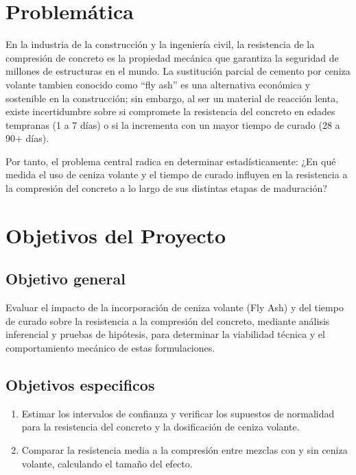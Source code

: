 \documentclass[
]{book}
\begin{document}
\section{Problemática}\label{problemuxe1tica}

En la industria de la construcción y la ingeniería civil, la resistencia de la compresión de concreto es la propiedad mecánica que garantiza la seguridad de millones de estructuras en el mundo. La sustitución parcial de cemento por ceniza volante tambien conocido como ``fly ash'' es una alternativa económica y sostenible en la construcción; sin embargo, al ser un material de reacción lenta, existe incertidumbre sobre si compromete la resistencia del concreto en edades tempranas (1 a 7 días) o si la incrementa con un mayor tiempo de curado (28 a 90+ días).

Por tanto, el problema central radica en determinar estadísticamente: ¿En qué medida el uso de ceniza volante y el tiempo de curado influyen en la resistencia a la compresión del concreto a lo largo de sus distintas etapas de maduración?

\section{Objetivos del Proyecto}\label{objetivos-del-proyecto}

\subsection{Objetivo general}\label{objetivo-general}

Evaluar el impacto de la incorporación de ceniza volante (Fly Ash) y del tiempo de curado sobre la resistencia a la compresión del concreto, mediante análisis inferencial y pruebas de hipótesis, para determinar la viabilidad técnica y el comportamiento mecánico de estas formulaciones.

\subsection{Objetivos especificos}\label{objetivos-especificos}

\begin{enumerate}
\def\labelenumi{\arabic{enumi}.}
\item
  Estimar los intervalos de confianza y verificar los supuestos de normalidad para la resistencia del concreto y la dosificación de ceniza volante.
\item
  Comparar la resistencia media a la compresión entre mezclas con y sin ceniza volante, calculando el tamaño del efecto.
\end{enumerate}
\end{document}
